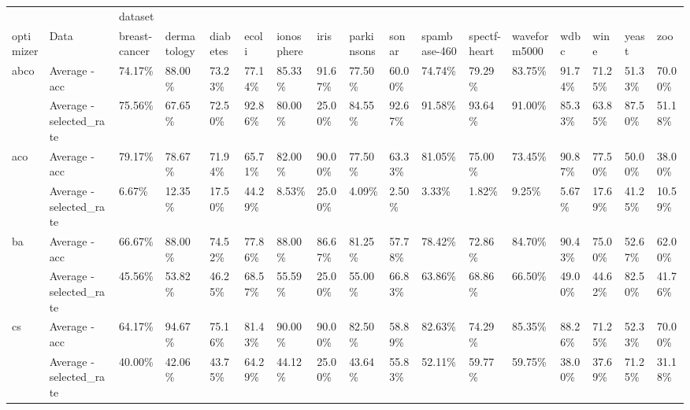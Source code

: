 \begin{table}
    \centering
    \begin{adjustbox}{width=\linewidth}
        \begin{tabular}{lllllllllllllllll}
            \toprule
                      &                          & dataset       &             &          &         &            &         &            &         &              &              &              &         &         &         & \tabularnewline
            optimizer & Data                     & breast-cancer & dermatology & diabetes & ecoli   & ionosphere & iris    & parkinsons & sonar   & spambase-460 & spectf-heart & waveform5000 & wdbc    & wine    & yeast   & zoo\tabularnewline
            \midrule
            abco      & Average - acc            & 74.17\%       & 88.00\%     & 73.23\%  & 77.14\% & 85.33\%    & 91.67\% & 77.50\%    & 60.00\% & 74.74\%      & 79.29\%      & 83.75\%      & 91.74\% & 71.25\% & 51.33\% & 70.00\%\tabularnewline
                      & Average - selected\_rate & 75.56\%       & 67.65\%     & 72.50\%  & 92.86\% & 80.00\%    & 25.00\% & 84.55\%    & 92.67\% & 91.58\%      & 93.64\%      & 91.00\%      & 85.33\% & 63.85\% & 87.50\% & 51.18\%\tabularnewline
            aco       & Average - acc            & 79.17\%       & 78.67\%     & 71.94\%  & 65.71\% & 82.00\%    & 90.00\% & 77.50\%    & 63.33\% & 81.05\%      & 75.00\%      & 73.45\%      & 90.87\% & 77.50\% & 50.00\% & 38.00\%\tabularnewline
                      & Average - selected\_rate & 6.67\%        & 12.35\%     & 17.50\%  & 44.29\% & 8.53\%     & 25.00\% & 4.09\%     & 2.50\%  & 3.33\%       & 1.82\%       & 9.25\%       & 5.67\%  & 17.69\% & 41.25\% & 10.59\%\tabularnewline
            ba        & Average - acc            & 66.67\%       & 88.00\%     & 74.52\%  & 77.86\% & 88.00\%    & 86.67\% & 81.25\%    & 57.78\% & 78.42\%      & 72.86\%      & 84.70\%      & 90.43\% & 75.00\% & 52.67\% & 62.00\%\tabularnewline
                      & Average - selected\_rate & 45.56\%       & 53.82\%     & 46.25\%  & 68.57\% & 55.59\%    & 25.00\% & 55.00\%    & 66.83\% & 63.86\%      & 68.86\%      & 66.50\%      & 49.00\% & 44.62\% & 82.50\% & 41.76\%\tabularnewline
            cs        & Average - acc            & 64.17\%       & 94.67\%     & 75.16\%  & 81.43\% & 90.00\%    & 90.00\% & 82.50\%    & 58.89\% & 82.63\%      & 74.29\%      & 85.35\%      & 88.26\% & 71.25\% & 52.33\% & 70.00\%\tabularnewline
                      & Average - selected\_rate & 40.00\%       & 42.06\%     & 43.75\%  & 64.29\% & 44.12\%    & 25.00\% & 43.64\%    & 55.83\% & 52.11\%      & 59.77\%      & 59.75\%      & 38.00\% & 37.69\% & 71.25\% & 31.18\%\tabularnewline

\end{tabular}
\end{adjustbox}
\end{table}
